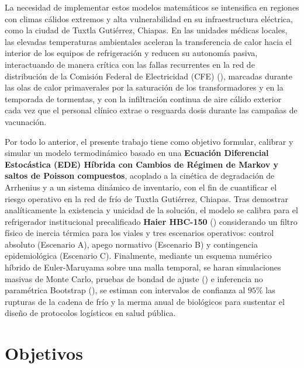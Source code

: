\documentclass[
  spanish,
  us-letterpaper,
]{scrreprt}
\numberwithin{equation}{section}
\theoremstyle{plain}
\theoremstyle{plain}
\theoremstyle{plain}
\theoremstyle{definition}
\theoremstyle{remark}
\begin{document}
La necesidad de implementar estos modelos matemáticos se intensifica en
regiones con climas cálidos extremos y alta vulnerabilidad en su
infraestructura eléctrica, como la ciudad de Tuxtla Gutiérrez, Chiapas.
En las unidades médicas locales, las elevadas temperaturas ambientales
aceleran la transferencia de calor hacia el interior de los equipos de
refrigeración y reducen su autonomía pasiva, interactuando de manera
crítica con las fallas recurrentes en la red de distribución de la
Comisión Federal de Electricidad (CFE)
(),
marcadas durante las olas de calor primaverales por la saturación de los
transformadores y en la temporada de tormentas, y con la infiltración
continua de aire cálido exterior cada vez que el personal clínico extrae
o resguarda dosis durante las campañas de vacunación.

Por todo lo anterior, el presente trabajo tiene como objetivo formular,
calibrar y simular un modelo termodinámico basado en una
\textbf{Ecuación Diferencial Estocástica (EDE) Híbrida con Cambios de
Régimen de Markov y saltos de Poisson compuestos}, acoplado a la
cinética de degradación de Arrhenius y a un sistema dinámico de
inventario, con el fin de cuantificar el riesgo operativo en la red de
frío de Tuxtla Gutiérrez, Chiapas. Tras demostrar analíticamente la
existencia y unicidad de la solución, el modelo se calibra para el
refrigerador institucional precalificado \textbf{Haier HBC-150}
()
considerando un filtro físico de inercia térmica para los viales y tres
escenarios operativos: control absoluto (Escenario A), apego normativo
(Escenario B) y contingencia epidemiológica (Escenario C). Finalmente,
mediante un esquema numérico híbrido de Euler-Maruyama sobre una malla
temporal, se haran simulaciones masivas de Monte Carlo, pruebas de
bondad de ajuste () e inferencia no paramétrica Bootstrap
(), se
estiman con intervalos de confianza al \(95\%\) las rupturas de la
cadena de frío y la merma anual de biológicos para sustentar el diseño
de protocolos logísticos en salud pública.


\chapter{Objetivos}\label{objetivos}
\end{document}

